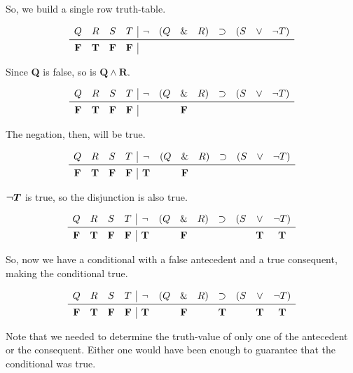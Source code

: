 \documentclass[../logic-text.tex]{subfiles}
\begin{document}
So, we build a single row truth-table.

\[
  \begin{array}{cccc|cccccccc}
    Q & R & S & T & \lneg & (Q & \land & R) & \lif & (S & \lor & \lneg T) \\ \midrule
    \false& \true & \false & \false &&&&&&&& \\
  \end{array}
\]

Since \textbf{Q} is false, so is \(\boldsymbol{Q \land R}\).


\[
  \begin{array}{cccc|cccccccc}
    Q & R & S & T & \lneg & (Q & \land & R) & \lif & (S & \lor & \lneg T) \\ \midrule
    \false& \true & \false & \false & & & \false &&&&& \\
  \end{array}
\]


  The negation, then, will be true.

\[
  \begin{array}{cccc|cccccccc}
    Q & R & S & T & \lneg & (Q & \land & R) & \lif & (S & \lor & \lneg T) \\ \midrule
    \false& \true & \false & \false & \true & & \false &&&&&
  \end{array}
\]


\(\boldsymbol{\neg T}\) is true, so the disjunction is also true.


\[
  \begin{array}{cccc|cccccccc}
    Q & R & S & T & \lneg & (Q & \land & R) & \lif & (S & \lor & \lneg T) \\ \midrule
    \false& \true & \false & \false & \true & & \false &&&& \true & \true
  \end{array}
\]

So, now we have a conditional with a false antecedent and a true consequent, making the conditional true.

\[
  \begin{array}{cccc|cccccccc}
    Q & R & S & T & \lneg & (Q & \land & R) & \lif & (S & \lor & \lneg T) \\ \midrule
    \false& \true & \false & \false & \true & & \false && \true && \true & \true
  \end{array}
\]

Note that we needed to determine the truth-value of only one of the antecedent or the consequent.
Either one would have been enough to guarantee that the conditional was true.
\end{document}
